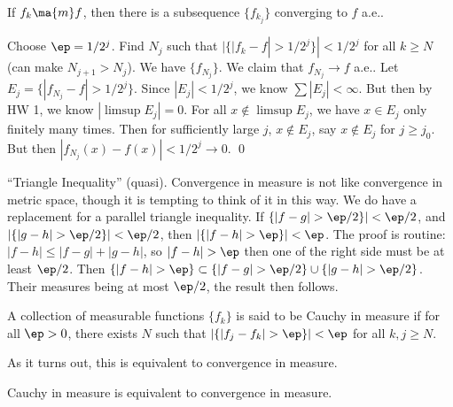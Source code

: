 \begin{thm}
If $f_k \ma{m} f$, then there is a subsequence $\{f_{k_j}\}$ converging to $f$ a.e.. 
\end{thm}

\pf Choose $\ep=1/2^j$. Find $N_j$ such that $|\{ |f_k-f|>1/2^j\}|<1/2^j$ for all $k \geq N$ (can make $N_{j+1}>N_j$). We have $\{f_{N_j}\}$. We claim that $f_{N_j} \to f$ a.e.. Let $E_j= \{ |f_{N_j}-f|>1/2^j\}$. Since $|E_j|<1/2^j$, we know $\sum |E_j|<\infty$. But then by HW 1, we know $|\limsup E_j|=0$. For all $x \notin \limsup E_j$, we have $x \in E_j$ only finitely many times. Then for sufficiently large $j$, $x \notin E_j$, say $x \notin E_j$ for $j \geq j_0$. But then $|f_{N_j}(x) - f(x)|<1/2^j \to 0$. \qed \\


\begin{rem}
``Triangle Inequality'' (quasi). Convergence in measure is not like convergence in metric space, though it is tempting to think of it in this way. We do have a replacement for a parallel triangle inequality. If $\{ |f-g|>\ep/2\}|<\ep/2$, and $|\{|g-h|>\ep/2\}|<\ep/2$, then $|\{ |f-h|>\ep\}|<\ep$. The proof is routine: $|f-h| \leq |f-g| + |g-h|$, so $|f-h|>\ep$ then one of the right side must be at least $\ep/2$. Then $\{|f-h|>\ep\} \subset \{|f-g|>\ep/2\} \cup \{|g-h|>\ep/2\}$. Their measures being at most $\ep/2$, the result then follows. 
\end{rem}


\begin{dfn}
A collection of measurable functions $\{f_k\}$ is said to be Cauchy in measure if for all $\ep>0$, there exists $N$ such that $|\{ |f_j-f_k|>\ep\}|<\ep$ for all $k,j \geq N$. 
\end{dfn}


As it turns out, this is equivalent to convergence in measure.


\begin{thm}
Cauchy in measure is equivalent to convergence in measure. 
\end{thm}

